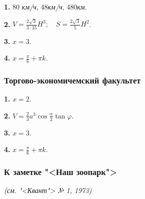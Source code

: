     \begin{onehalfspace}
    \textbf{1. } 80 \textit{км/ч}, 48\textit{км/ч}, 480\textit{км}.\par
    \textbf{2. } \(V=\frac{2\sqrt{3}}{3\cdot35}H^3; \quad S=\frac{2\sqrt{3}}{5}H^2\).\par
    \textbf{3. } \(x=3\).\par
    \textbf{4. } \(x=\frac{\pi}{6} + \pi k\).\par
    \end{onehalfspace}\par
    \begin{center}
    \subsubsection*{Торгово-экономичемский факультет}
    \end{center}\par
    \begin{onehalfspace}
    \textbf{1. } \(x=2\).\par
    \textbf{2. } \(V=\frac{2}{3}a^3\cos{\frac{\alpha}{2}}\tan{\varphi}\).\par
    \textbf{3. } \(x=3\).\par
    \textbf{4. } \(x=\frac{\pi}{6} + \pi k\).\par
    \end{onehalfspace}
    \begin{flushleft}
    \subsubsection*{К заметке "<Наш зоопарк">}
    \end{flushleft}\par
    \begin{center}
    \textit{(см. "<Квант"> № 1, 1973)}
    \end{center}
